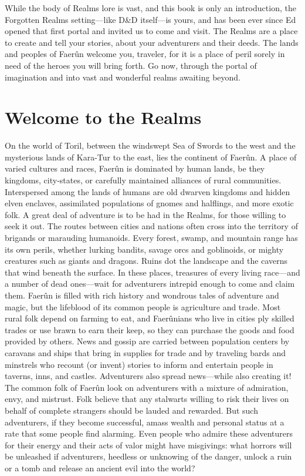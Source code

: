 \documentclass[10pt,a4paper,twoside,twocolumn,openany,bg=print,nodeprecatedcode]{dndbook}
\begin{document}
While the body of Realms lore is vast, and this book is only an introduction, the Forgotten Realms setting—like D\&D itself—is yours, and has been ever since Ed opened that first portal and invited us to come and visit. The Realms are a place to create and tell your stories, about your adventurers and their deeds. The lands and peoples of Faerûn welcome you, traveler, for it is a place of peril sorely in need of the heroes you will bring forth. Go now, through the portal of imagination and into vast and wonderful realms awaiting beyond.
\chapter{Welcome to the Realms}
On the world of Toril, between the windswept Sea of Swords to the west and the mysterious lands of Kara-Tur to the east, lies the continent of Faerûn. A place of varied cultures and races, Faerûn is dominated by human lands, be they kingdoms, city-states, or carefully maintained alliances of rural communities. Interspersed among the lands of humans are old dwarven kingdoms and hidden elven enclaves, assimilated populations of gnomes and halflings, and more exotic folk.
A great deal of adventure is to be had in the Realms, for those willing to seek it out. The routes between cities and nations often cross into the territory of brigands or marauding humanoids. Every forest, swamp, and mountain range has its own perils, whether lurking bandits, savage orcs and goblinoids, or mighty creatures such as giants and dragons. Ruins dot the landscape and the caverns that wind beneath the surface. In these places, treasures of every living race—and a number of dead ones—wait for adventurers intrepid enough to come and claim them.
Faerûn is filled with rich history and wondrous tales of adventure and magic, but the lifeblood of its common people is agriculture and trade. Most rural folk depend on farming to eat, and Faerûnians who live in cities ply skilled trades or use brawn to earn their keep, so they can purchase the goods and food provided by others. News and gossip are carried between population centers by caravans and ships that bring in supplies for trade and by traveling bards and minstrels who recount (or invent) stories to inform and entertain people in taverns, inns, and castles. Adventurers also spread news—while also creating it!
The common folk of Faerûn look on adventurers with a mixture of admiration, envy, and mistrust. Folk believe that any stalwarts willing to risk their lives on behalf of complete strangers should be lauded and rewarded. But such adventurers, if they become successful, amass wealth and personal status at a rate that some people find alarming. Even people who admire these adventurers for their energy and their acts of valor might have misgivings: what horrors will be unleashed if adventurers, heedless or unknowing of the danger, unlock a ruin or a tomb and release an ancient evil into the world?
\end{document}
